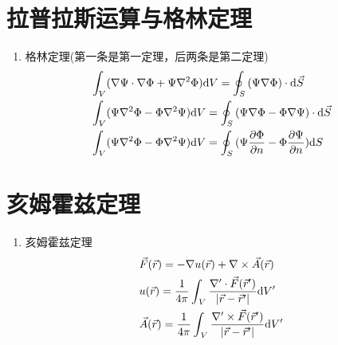 \section{拉普拉斯运算与格林定理}
\begin{enumerate}
	\item 格林定理(第一条是第一定理，后两条是第二定理)
	\begin{eqnarray}
	&\int_{V} (\nabla \Psi  \cdot \nabla \Phi  + \Psi {\nabla ^2}\Phi ){\rm{d}}V}  = \oint_{S} {(\Psi \nabla \Phi ) \cdot {\rm{d}}\vec S & \\
	&\int_{V} (\Psi {\nabla ^2}\Phi  - \Phi {\nabla ^2}\Psi ){\rm{d}}V}  = \oint_{S} {(\Psi \nabla \Phi  - \Phi \nabla \Psi ) \cdot {\rm{d}}\vec S& \\
	&\int_{V} (\Psi {\nabla ^2}\Phi  - \Phi {\nabla ^2}\Psi ){\rm{d}}V}  = \oint_{S} {(\Psi {{\partial \Phi } \over {\partial n}} - \Phi {{\partial \Psi } \over {\partial n}}){\rm{d}}S&
	\end{eqnarray}
\end{enumerate}

\section{亥姆霍兹定理}
\begin{enumerate}
	\item 亥姆霍兹定理
	\begin{eqnarray}
	&\vec F(\vec r) =  - \nabla u(\vec r) + \nabla  \times \vec A(\vec r)& \\
	&u(\vec r) = {1 \over {4{\rm{\pi }}}}\int_{{\kern 1pt} V} {{{\nabla ' \cdot \vec F(\vec r')} \over {\left| {\vec r - \vec r'} \right|}}} {\rm{d}}V'& \\
	&\vec A(\vec r) = {1 \over {4{\rm{\pi }}}}\int_{{\kern 1pt} V} {{{\nabla ' \times \vec F(\vec r')} \over {\left| {\vec r - \vec r'} \right|}}{\rm{d}}V'} &
	\end{eqnarray}
\end{enumerate}
